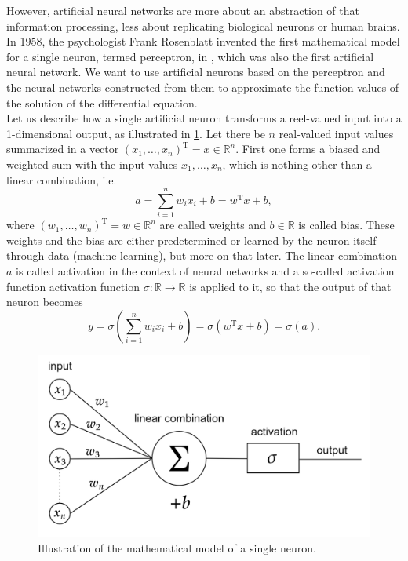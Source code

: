 However, artificial neural networks are more about an abstraction of that information processing, less about replicating biological neurons or human brains. In 1958, the psychologist Frank Rosenblatt invented the first mathematical model for a single neuron, termed perceptron, in \cite{Rosenblatt:1958}, which was also the first artificial neural network. We want to use artificial neurons based on the perceptron and the neural networks constructed from them to approximate the function values of the solution of the differential equation.  \\
Let us describe how a single artificial neuron transforms a reel-valued input into a 1-dimensional output, as illustrated in \cref{fig4}. Let there be $n$ real-valued input values summarized in a vector $(x_1, \ldots, x_n)^{\mathrm{T}} = x \in \mathbb{R}^n$. First one forms a biased and weighted sum with the input values $x_1, \ldots, x_n$, which is nothing other than a linear combination, i.e. 
\begin{equation*}
    a = \sum^{n}_{i=1} w_i x_i + b = w^{\mathrm{T}} x + b,
\end{equation*}
where $(w_1, \ldots, w_n)^{\mathrm{T}} = w \in \mathbb{R}^n$ are called weights and $b \in \mathbb{R}$ is called bias. These weights and the bias are either predetermined or learned by the neuron itself through data (machine learning), but more on that later. The linear combination $a$ is called activation in the context of neural networks and a so-called activation function activation function $\sigma \colon \mathbb{R} \to \mathbb{R}$ is applied to it, so that the output of that neuron becomes
\begin{equation*}
    y = \sigma \left( \sum^{n}_{i=1} w_i x_i + b \right) = \sigma \left( w^{\mathrm{T}} x + b \right) = \sigma(a).
\end{equation*}

\begin{figure}[H]
    \begin{center}
        \includegraphics[scale=0.25]{img/diagram-20220205_1.png}
    \end{center}
    \caption{Illustration of the mathematical model of a single neuron.}
    \label{fig4}
\end{figure}


